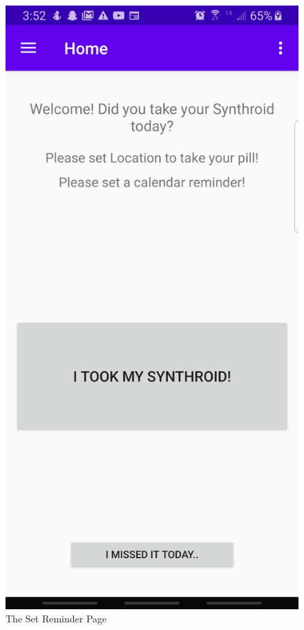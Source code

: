 \documentclass{article}
\begin{document}
\begin{figure}[H]
\centering
\includegraphics[scale= .1]{img/home.jpg}
\caption{The Set Reminder Page}
\label{fig:reminder} 
\end{figure}
\end{document}
